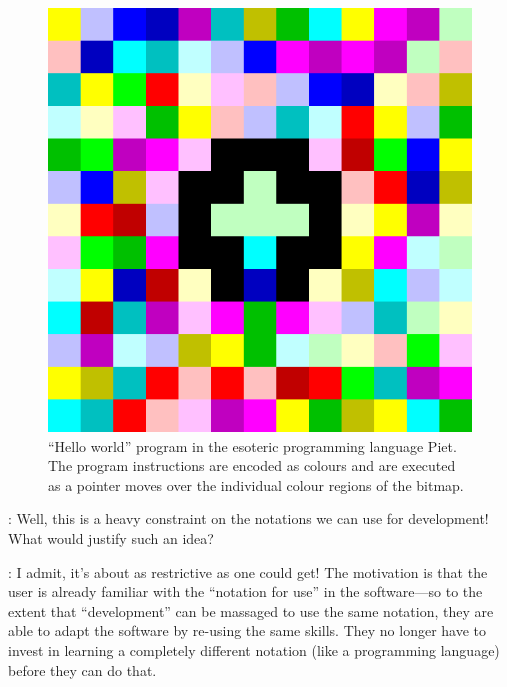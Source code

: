 \documentclass[runningheads]{llncs}
\newcommand{\T}{Tomas}
\newcommand{\J}{Joel}
\newcommand{\says}[2][gg]{\vspace{0.5em}\noindent\hangindent=0.5cm{\textsc{#1}}: #2}
\begin{document}
\begin{figure}[t]
\centering
\begin{minipage}[t]{0.4\textwidth}\vspace{0pt}
  \includegraphics[scale=0.27]{figures/piet.png}
\end{minipage}
\begin{minipage}[t]{0.5\textwidth}\vspace{0pt}
  \caption{``Hello world'' program in the esoteric programming language Piet. The program instructions are encoded as colours and are executed as a pointer moves over the individual colour regions of the bitmap.}
  \label{fig:piet}
\end{minipage}
\end{figure}

\says[\T]{Well, this is a heavy constraint on the notations we can use for development! What would justify such an idea?}

\says[\J]{I admit, it's about as restrictive as one could get! The motivation is that the user is already familiar with the ``notation for use'' in the software---so to the extent that ``development'' can be massaged to use the same notation, they are able to adapt the software by re-using the same skills. They no longer have to invest in learning a completely different notation (like a programming language) before they can do that.}
\end{document}
